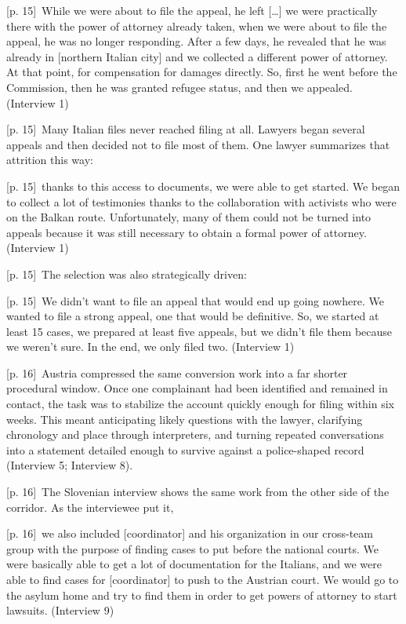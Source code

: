 \documentclass[10pt,a4paper]{article}
\begin{document}
{\scriptsize\color{gray} [p. 15]}\ While we were about to file the appeal, he left […] we were practically there with the power of attorney already taken, when we were about to file the appeal, he was no longer responding. After a few days, he revealed that he was already in [northern Italian city] and we collected a different power of attorney. At that point, for compensation for damages directly. So, first he went before the Commission, then he was granted refugee status, and then we appealed. (Interview 1)\par
{\scriptsize\color{gray} [p. 15]}\ Many Italian files never reached filing at all. Lawyers began several appeals and then decided not to file most of them. One lawyer summarizes that attrition this way:\par
{\scriptsize\color{gray} [p. 15]}\ thanks to this access to documents, we were able to get started. We began to collect a lot of testimonies thanks to the collaboration with activists who were on the Balkan route. Unfortunately, many of them could not be turned into appeals because it was still necessary to obtain a formal power of attorney. (Interview 1)\par
{\scriptsize\color{gray} [p. 15]}\ The selection was also strategically driven:\par
{\scriptsize\color{gray} [p. 15]}\ We didn’t want to file an appeal that would end up going nowhere. We wanted to file a strong appeal, one that would be definitive. So, we started at least 15 cases, we prepared at least five appeals, but we didn’t file them because we weren’t sure. In the end, we only filed two. (Interview 1)\par
{\scriptsize\color{gray} [p. 16]}\ Austria compressed the same conversion work into a far shorter procedural window. Once one complainant had been identified and remained in contact, the task was to stabilize the account quickly enough for filing within six weeks. This meant anticipating likely questions with the lawyer, clarifying chronology and place through interpreters, and turning repeated conversations into a statement detailed enough to survive against a police-shaped record (Interview 5; Interview 8).\par
{\scriptsize\color{gray} [p. 16]}\ The Slovenian interview shows the same work from the other side of the corridor. As the interviewee put it,\par
{\scriptsize\color{gray} [p. 16]}\ we also included [coordinator] and his organization in our cross-team group with the purpose of finding cases to put before the national courts. We were basically able to get a lot of documentation for the Italians, and we were able to find cases for [coordinator] to push to the Austrian court. We would go to the asylum home and try to find them in order to get powers of attorney to start lawsuits. (Interview 9)\par
\end{document}
